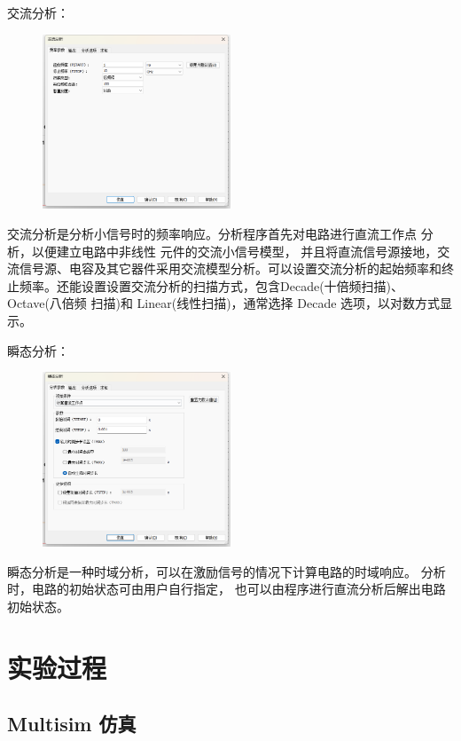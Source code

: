 \documentclass[a4paper,11pt,UTF8]{article}
\numberwithin{equation}{subsection}
\begin{document}
交流分析：
\begin{figure}[H]
	\centering
	\includegraphics[width=0.5\textwidth]{5.2.3_3}	
\end{figure}

交流分析是分析小信号时的频率响应。分析程序首先对电路进行直流工作点
分析，以便建立电路中非线性 元件的交流小信号模型， 并且将直流信号源接地，交流信号源、电容及其它器件采用交流模型分析。可以设置交流分析的起始频率和终止频率。还能设置设置交流分析的扫描方式，包含Decade(十倍频扫描)、 Octave(八倍频 扫描)和 Linear(线性扫描)，通常选择 Decade 选项，以对数方式显示。

瞬态分析：
\begin{figure}[H]
	\centering
	\includegraphics[width=0.5\textwidth]{5.2.3_4}	
\end{figure}

瞬态分析是一种时域分析，可以在激励信号的情况下计算电路的时域响应。
分析时，电路的初始状态可由用户自行指定， 也可以由程序进行直流分析后解出电路初始状态。

\section{实验过程}
\subsection{Multisim 仿真}
\end{document}
